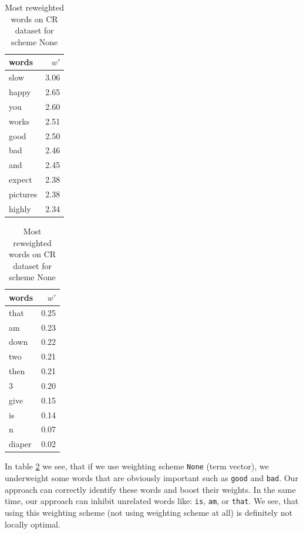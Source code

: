 \begin{table}[H]
    \centering
    \begin{minipage}{.4\linewidth}
      \centering
        \begin{tabular}{lr}
\toprule
    words &  $w'$ \\
\midrule
     slow &  3.06 \\
    happy &  2.65 \\
      you &  2.60 \\
    works &  2.51 \\
     good &  2.50 \\
      bad &  2.46 \\
      and &  2.45 \\
   expect &  2.38 \\
 pictures &  2.38 \\
   highly &  2.34 \\
\bottomrule
\end{tabular}

    \end{minipage}
    \begin{minipage}{.4\linewidth}
      \centering
        \begin{tabular}{lr}
\toprule
  words &  $w'$ \\
\midrule
   that &  0.25 \\
     am &  0.23 \\
   down &  0.22 \\
    two &  0.21 \\
   then &  0.21 \\
      3 &  0.20 \\
   give &  0.15 \\
     is &  0.14 \\
      n &  0.07 \\
 diaper &  0.02 \\
\bottomrule
\end{tabular}

    \end{minipage} 
    \caption{Most reweighted words on CR dataset for scheme None}
    \label{tab:words:CR:None}
\end{table}

    In table \ref{tab:words:CR:None} we see, that if we use weighting scheme \texttt{None} (term vector), 
    we underweight some words that are obviously important such as \texttt{good} and \texttt{bad}.
    Our approach can correctly identify these words and boost their weights.
    In the same time, our approach can inhibit unrelated words like: \texttt{is}, \texttt{am}, or \texttt{that}.
    We see, that using this weighting scheme (not using weighting scheme at all) is definitely not locally optimal.
    

